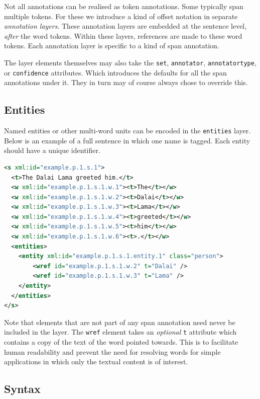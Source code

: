 \documentclass[a4paper,12pt]{report}
\begin{document}
Not all annotations can be realised as token annotations. Some typically span multiple tokens. For these we introduce a kind of offset notation in separate \emph{annotation layers}. These annotation layers are embedded at the sentence level, \emph{after} the word tokens. Within these layers, references are made to these word tokens. Each annotation layer is specific to a kind of span annotation.

The layer elements themselves may also take the \texttt{set}, \texttt{annotator}, \texttt{annotatortype}, or \texttt{confidence} attributes. Which introduces the defaults for all the span annotations under it. They in turn may of course always chose to override this.

\subsection{Entities}

Named entities or other multi-word units can be encoded in the \texttt{entities} layer. Below is an example of a full sentence in which one name is tagged. Each entity should have a unique identifier.


\begin{lstlisting}[language=xml]
<s xml:id="example.p.1.s.1">
  <t>The Dalai Lama greeted him.</t>
  <w xml:id="example.p.1.s.1.w.1"><t>The</t></w>
  <w xml:id="example.p.1.s.1.w.2"><t>Dalai</t></w>
  <w xml:id="example.p.1.s.1.w.3"><t>Lama</t></w>
  <w xml:id="example.p.1.s.1.w.4"><t>greeted</t></w>
  <w xml:id="example.p.1.s.1.w.5"><t>him</t></w>
  <w xml:id="example.p.1.s.1.w.6"><t>.</t></w>
  <entities>
    <entity xml:id="example.p.1.s.1.entity.1" class="person">
        <wref id="example.p.1.s.1.w.2" t="Dalai" />
        <wref id="example.p.1.s.1.w.3" t="Lama" />
    </entity>
  </entities>
</s>
\end{lstlisting}

Note that elements that are not part of any span annotation need never be included in the layer. The \texttt{wref} element takes an \emph{optional} \texttt{t} attribute which contains a copy of the text of the word pointed towards. This is to facilitate human readability and prevent the need for resolving words for simple applications in which only the textual content is of interest.

\subsection{Syntax}
\end{document}
